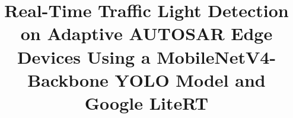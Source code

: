 \documentclass[conference]{IEEEtran}
\begin{document}
\balance
\title{Real-Time Traffic Light Detection on Adaptive AUTOSAR Edge Devices Using a MobileNetV4-Backbone YOLO Model and Google LiteRT \\
}

\end{document}
